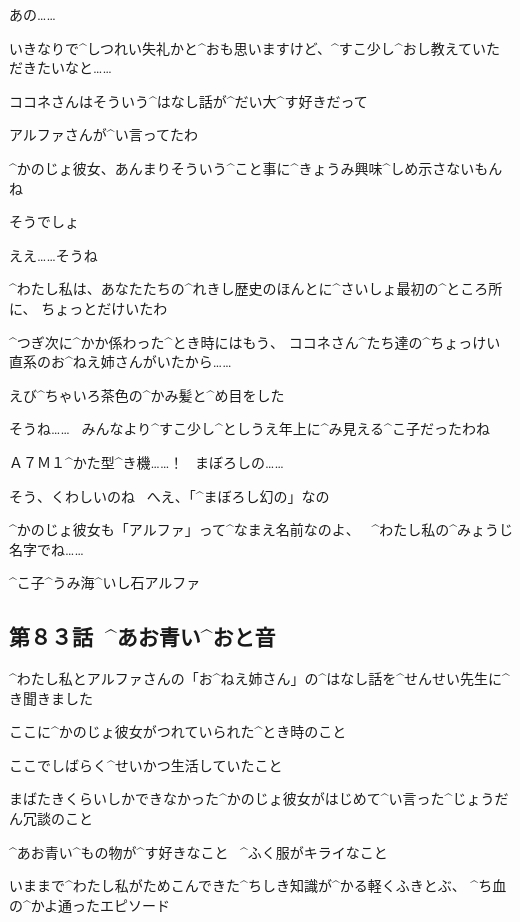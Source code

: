\Kokone あの……

\Kokone いきなりで^{しつれい}{失礼}かと^{おも}{思}いますけど、^{すこ}{少}し^{おし}{教}えていただきたいなと……

\Sensei ココネさんはそういう^{はなし}{話}が^{だい}{大}^{す}{好}きだって

\Sensei アルファさんが^{い}{言}ってたわ

\page
\Sensei ^{かのじょ}{彼女}、あんまりそういう^{こと}{事}に^{きょうみ}{興味}^{しめ}{示}さないもんね

\Sensei そうでしょ

\Sensei ええ……そうね

\Sensei ^{わたし}{私}は、あなたたちの^{れきし}{歴史}のほんとに^{さいしょ}{最初}の^{ところ}{所}に、
ちょっとだけいたわ

\Sensei ^{つぎ}{次}に^{かか}{係}わった^{とき}{時}にはもう、
ココネさん^{たち}{達}の^{ちょっけい}{直系}のお^{ねえ}{姉}さんがいたから……

\page
\Sensei えび^{ちゃいろ}{茶色}の^{かみ}{髪}と^{め}{目}をした

\Sensei そうね……
\ みんなより^{すこ}{少}し^{としうえ}{年上}に^{み}{見}える^{こ}{子}だったわね

\Kokone Ａ７Ｍ１^{かた}{型}^{き}{機}……！
\ まぼろしの……

\Sensei そう、くわしいのね
\ へえ、「^{まぼろし}{幻}の」なの

\page
\Sensei ^{かのじょ}{彼女}も「アルファ」って^{なまえ}{名前}なのよ、
\ ^{わたし}{私}の^{みょうじ}{名字}でね……

\Sensei ^{こ}{子}^{うみ}{海}^{いし}{石}アルファ


\subsection{第８３話\ ^{あお}{青}い^{おと}{音}}

\page[84]
\Kokone ^{わたし}{私}とアルファさんの「お^{ねえ}{姉}さん」の^{はなし}{話}を^{せんせい}{先生}に^{き}{聞}きました

\Kokone ここに^{かのじょ}{彼女}がつれていられた^{とき}{時}のこと

\Kokone ここでしばらく^{せいかつ}{生活}していたこと

\page
\Kokone まばたきくらいしかできなかった^{かのじょ}{彼女}がはじめて^{い}{言}った^{じょうだん}{冗談}のこと

\Kokone ^{あお}{青}い^{もの}{物}が^{す}{好}きなこと
\ ^{ふく}{服}がキライなこと

\Kokone いままで^{わたし}{私}がためこんできた^{ちしき}{知識}が^{かる}{軽}くふきとぶ、
^{ち}{血}の^{かよ}{通}ったエピソード

